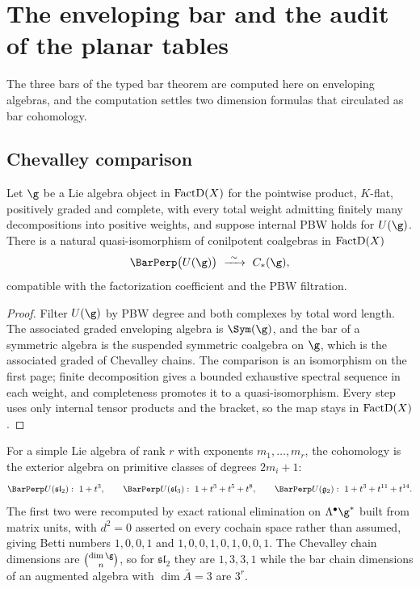 \chapter{The enveloping bar and the audit of the planar tables}
\label{ch:enveloping-audit}

The three bars of the typed bar theorem are computed here on enveloping
algebras, and the computation settles two dimension formulas that circulated
as bar cohomology.

\section{Chevalley comparison}

\begin{theorem}
\label{thm:bar-chevalley-spine}
Let $\g$ be a Lie algebra object in $\operatorname{FactD}(X)$ for the pointwise product,
$K$-flat, positively graded and complete, with every total weight admitting
finitely many decompositions into positive weights, and suppose internal PBW
holds for $U(\g)$. There is a natural quasi-isomorphism of conilpotent
coalgebras in $\operatorname{FactD}(X)$
\[
 \BarPerp\bigl(U(\g)\bigr)\ \xrightarrow{\ \sim\ }\ C_*(\g),
\]
compatible with the factorization coefficient and the PBW filtration.
\end{theorem}
\begin{proof}
Filter $U(\g)$ by PBW degree and both complexes by total word length. The
associated graded enveloping algebra is $\Sym(\g)$, and the bar of a symmetric
algebra is the suspended symmetric coalgebra on $\g$, which is the associated
graded of Chevalley chains. The comparison is an isomorphism on the first page;
finite decomposition gives a bounded exhaustive spectral sequence in each
weight, and completeness promotes it to a quasi-isomorphism. Every step uses
only internal tensor products and the bracket, so the map stays in $\operatorname{FactD}(X)$.
\end{proof}

\begin{calculation}
\label{calc:simple-spine}
For a simple Lie algebra of rank $r$ with exponents $m_1,\dots,m_r$, the
cohomology is the exterior algebra on primitive classes of degrees $2m_i+1$:
\[
 \BarPerp U(\mathfrak{sl}_2):\ 1+t^3,
 \qquad
 \BarPerp U(\mathfrak{sl}_3):\ 1+t^3+t^5+t^8,
 \qquad
 \BarPerp U(\mathfrak g_2):\ 1+t^3+t^{11}+t^{14}.
\]
The first two were recomputed by exact rational elimination on
$\Lambda^\bullet\g^*$ built from matrix units, with $d^2=0$ asserted on every
cochain space rather than assumed, giving Betti numbers $1,0,0,1$ and
$1,0,0,1,0,1,0,0,1$. The Chevalley chain dimensions are
$\binom{\dim\g}{n}$, so for $\mathfrak{sl}_2$ they are $1,3,3,1$ while the bar
chain dimensions of an augmented algebra with $\dim\bar A=3$ are $3^r$.
\end{calculation}

